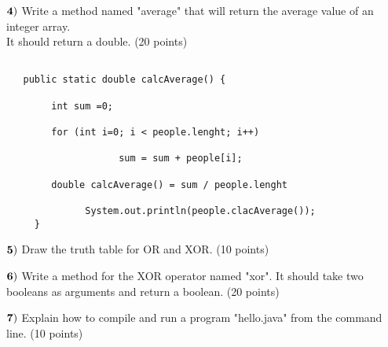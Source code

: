 \documentclass{article}
\begin{document}
  $\bf{4)}$ Write a method named "average" that will return the average value of an integer array. \\
   It should return a double.  (20 points)
   \vspace{0.5cm}
   
     \begin{verbatim}

   public static double calcAverage() {
        
        int sum =0;
        
        for (int i=0; i < people.lenght; i++)
        
                    sum = sum + people[i];
                    
        double calcAverage() = sum / people.lenght
        
              System.out.println(people.clacAverage());
     }     
         \end{verbatim}
         
  $\bf{5)}$ Draw the truth table for OR and XOR.  (10 points)
   \vspace{0.5cm}
   
  $\bf{6)}$ Write a method for the XOR operator named "xor".  It should take two booleans as arguments and return a boolean.  (20 points)
   \vspace{0.5cm}
   
   $\bf{7)}$ Explain how to compile and run a program "hello.java" from the command line.  (10 points)
  


  
  
  
    

 
\end{document}
